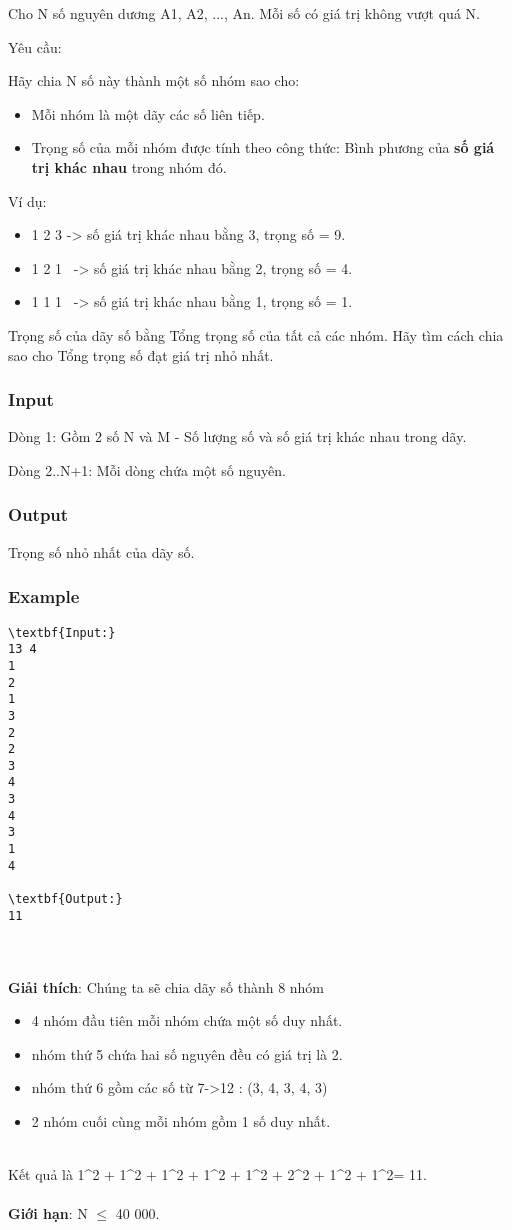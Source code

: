 

Cho N số nguyên dương A1, A2, ..., An. Mỗi số có giá trị không vượt quá N.

Yêu cầu:

Hãy chia N số này thành một số nhóm sao cho:
\begin{itemize}
	\item Mỗi nhóm là một dãy các số liên tiếp.
	\item Trọng số của mỗi nhóm được tính theo công thức: Bình phương của \textbf{số giá trị khác nhau} trong nhóm đó.
\end{itemize}

Ví dụ:
\begin{itemize}
	\item 1 2 3 -> số giá trị khác nhau bằng 3, trọng số = 9.
	\item 1 2 1  -> số giá trị khác nhau bằng 2, trọng số = 4.
	\item 1 1 1  -> số giá trị khác nhau bằng 1, trọng số = 1.
\end{itemize}

Trọng số của dãy số bằng Tổng trọng số của tất cả các nhóm. Hãy tìm cách chia sao cho Tổng trọng số đạt giá trị nhỏ nhất.

\subsubsection{Input}

Dòng 1: Gồm 2 số N và M - Số lượng số và số giá trị khác nhau trong dãy.

Dòng 2..N+1: Mỗi dòng chứa một số nguyên.

\subsubsection{Output}

Trọng số nhỏ nhất của dãy số.

\subsubsection{Example}
\begin{verbatim}
\textbf{Input:}
13 4
1
2
1
3
2
2
3
4
3
4
3
1
4

\textbf{Output:}
11\end{verbatim}


\\
\\\textbf{Giải thích}: Chúng ta sẽ chia dãy số thành 8 nhóm
\begin{itemize}
	\item 4 nhóm đầu tiên mỗi nhóm chứa một số duy nhất.
	\item nhóm thứ 5 chứa hai số nguyên đều có giá trị là 2.
	\item nhóm thứ 6 gồm các số từ 7->12 : (3, 4, 3, 4, 3)
	\item 2 nhóm cuối cùng mỗi nhóm gồm 1 số duy nhất.
\end{itemize}


\\Kết quả là 1^2 + 1^2 + 1^2 + 1^2 + 1^2 + 2^2 + 1^2 + 1^2= 11.
\\
\\\textbf{Giới hạn}: N  $\le$  40 000.
